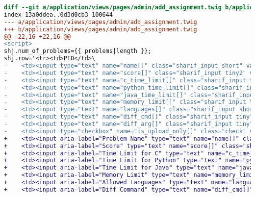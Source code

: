 \begin{itemize}
\begin{lstlisting}[language=diff, caption=Perubahan untuk mematuhi kriteria 1.3.1, label=lst_1.3.1, basicstyle=\ttfamily, frame=single,
columns=fullflexible, keepspaces=true, breaklines=true]
diff --git a/application/views/pages/admin/add_assignment.twig b/application/views/pages/admin/add_assignment.twig
index 13a0ddea..0d3d0cb3 100644
--- a/application/views/pages/admin/add_assignment.twig
+++ b/application/views/pages/admin/add_assignment.twig
@@ -22,16 +22,16 @@
<script>
shj.num_of_problems={{ problems|length }};
shj.row='<tr><td>PID</td>\
-    <td><input type="text" name="name[]" class="sharif_input short" value="Problem "/></td>\
-    <td><input type="text" name="score[]" class="sharif_input tiny2" value="100"/></td>\
-    <td><input type="text" name="c_time_limit[]" class="sharif_input tiny2" value="500"/></td>\
-    <td><input type="text" name="python_time_limit[]" class="sharif_input tiny2" value="1500"/></td>\
-    <td><input type="text" name="java_time_limit[]" class="sharif_input tiny2" value="2000"/></td>\
-    <td><input type="text" name="memory_limit[]" class="sharif_input tiny" value="50000"/></td>\
-    <td><input type="text" name="languages[]" class="sharif_input short2" value="C,C++,Python 2,Python 3,Java"/></td>\
-    <td><input type="text" name="diff_cmd[]" class="sharif_input tiny" value="diff"/></td>\
-    <td><input type="text" name="diff_arg[]" class="sharif_input tiny" value="-bB"/></td>\
-    <td><input type="checkbox" name="is_upload_only[]" class="check" value="PID"/><td><i class="fa fa-times-circle fa-lg color1 delete_problem pointer"></i></td></td>\
+    <td><input aria-label="Problem Name" type="text" name="name[]" class="sharif_input short" value="Problem "/></td>\
+    <td><input aria-label="Score" type="text" name="score[]" class="sharif_input tiny2" value="100"/></td>\
+    <td><input aria-label="Time Limit for C" type="text" name="c_time_limit[]" class="sharif_input tiny2" value="500"/></td>\
+    <td><input aria-label="Time Limit for Python" type="text" name="python_time_limit[]" class="sharif_input tiny2" value="1500"/></td>\
+    <td><input aria-label="Time Limit for Java" type="text" name="java_time_limit[]" class="sharif_input tiny2" value="2000"/></td>\
+    <td><input aria-label="Memory Limit" type="text" name="memory_limit[]" class="sharif_input tiny" value="50000"/></td>\
+    <td><input aria-label="Allowed Languages" type="text" name="languages[]" class="sharif_input short2" value="C,C++,Python 2,Python 3,Java"/></td>\
+    <td><input aria-label="Diff Command" type="text" name="diff_cmd[]" class="sharif_input tiny" value="diff"/></td>\

\end{lstlisting}
\end{itemize}
